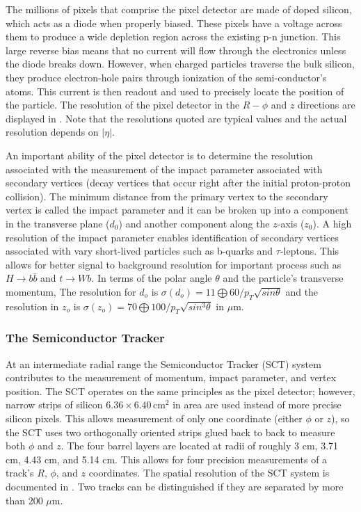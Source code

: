 The millions of pixels that comprise the pixel detector are made of
doped silicon, which acts as a diode when properly biased. These
pixels have a voltage across them to produce a wide depletion region across
the existing p-n junction. This large reverse bias means that no current
will flow through the electronics unless the diode breaks down. However,
when charged particles traverse the bulk silicon, they produce electron-hole pairs
through ionization of the semi-conductor's atoms. This current is then readout
and used to precisely locate the position of the particle. The resolution of
the pixel detector in the $R-\phi$ and $z$ directions 
are displayed in . Note that the resolutions
quoted are typical values and the actual resolution depends on $|\eta|$.

An important 
ability of the pixel detector is to determine the resolution associated with
the measurement of the impact parameter associated with secondary vertices
(decay vertices that occur right after the initial proton-proton collision). 
The minimum distance from the primary vertex to the secondary vertex is called
the impact parameter and it can be broken up into a component in the transverse
plane ($d_0$) and another component along the $z$-axis ($z_0$). A high resolution
of the impact parameter enables identification of secondary vertices
associated with vary short-lived particles such as 
b-quarks and $\tau$-leptons. This allows for
better signal to background resolution for important process such as
$H \to b\bar b$ and $t \to W b$. In terms of
the polar angle $\theta$ and the particle's transverse momentum, 
The resolution for $d_o$ is
$\sigma(d_o) = 11 \bigoplus 60/p_T \sqrt{sin\theta}$ and the resolution in $z_o$
is $\sigma(z_o) = 70 \bigoplus 100/p_T \sqrt{sin^3\theta}$ in $\mu$m.

\subsubsection*{The Semiconductor Tracker}
At an intermediate radial range the Semiconductor Tracker (SCT) system contributes
to the measurement of momentum, impact parameter, and vertex position.
The SCT operates on the same principles as the pixel
detector; however, narrow strips of silicon $6.36 \times 6.40 \, \text{cm}^2$
in area are used instead of more precise silicon pixels. 
This allows measurement of only one coordinate (either $\phi$ or $z$), so the
SCT uses two orthogonally oriented strips glued back to back to measure both
$\phi$ and $z$. The four barrel layers are located at radii of roughly 3 cm,
3.71 cm, 4.43 cm, and 5.14 cm. This allows for four precision measurements of
a track's $R$, $\phi$, and $z$ coordinates. 
The spatial resolution of the SCT system is documented in .
Two tracks can be distinguished if they are separated by more than 200 $\mu$m.

